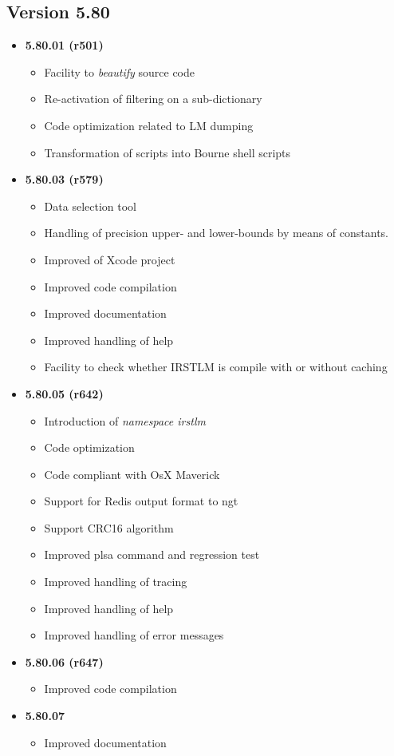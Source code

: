 \documentclass[11pt]{article}
\newcommand{\COMMENT}[1]{}
\begin{document}
\subsection{Version 5.80}
\begin{itemize}
\item {\bf 5.80.01 (r501)}
\begin{itemize}
\item Facility to {\em beautify} source code
\item Re-activation of filtering on a sub-dictionary
\item Code optimization related to LM dumping
\item Transformation of scripts into Bourne shell scripts 
\end{itemize}
\item {\bf 5.80.03 (r579)}
\begin{itemize}
\item Data selection tool
\item Handling of precision upper- and lower-bounds by means of constants.
\item Improved of Xcode project
\item Improved code compilation
\item Improved documentation
\item Improved handling of help
\item Facility to check whether IRSTLM is compile with or without caching
\end{itemize}
\item {\bf 5.80.05 (r642)}
\begin{itemize}
\item Introduction of {\em namespace irstlm}
\item Code optimization
\item Code compliant with OsX Maverick
\item Support for Redis output format to ngt
\item Support CRC16 algorithm
\item Improved plsa command and regression test
\item Improved handling of tracing
\item Improved handling of help
\item Improved handling of error messages
\end{itemize}
\item {\bf 5.80.06 (r647)}
\begin{itemize}
\item Improved code compilation
\end{itemize}
\item {\bf 5.80.07}
\begin{itemize}
\item Improved documentation
\end{itemize}
\end{itemize}


\COMMENT{
\subsection{Version 5.xx}
\begin{itemize}
\item {\bf 5.xx.01}
\begin{itemize}
\item 
\end{itemize}
\end{itemize}
}
\end{document}
